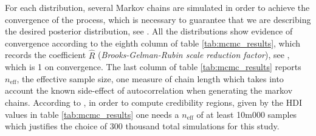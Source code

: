\documentclass[11pt]{article}
\begin{document}
 For each distribution, several Markov chains are simulated in order to achieve the convergence of the process, which is necessary to guarantee that we are describing the desired posterior distribution, see . All the distributions show evidence of convergence according to the eighth column of table \ref{tab:mcmc_results}, which records the coefficient $\widehat{R}$ ({\it{Brooks-Gelman-Rubin  scale  reduction  factor}}), see , which is 1 on convergence. The last column of table \ref{tab:mcmc_results} reports $n_{\text{eff}}$, the effective sample size, one measure of chain length which takes into account the known side-effect of autocorrelation when generating the markov chains. According to , in order to compute credibility regions, given by the HDI values in table \ref{tab:mcmc_results} one needs a $n_{\text{eff}}$ of at least 10m000 samples which justifies the choice of 300 thousand total simulations for this study. 
 
%

\end{document}
